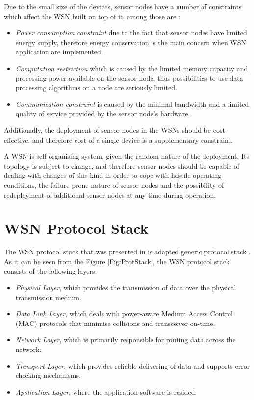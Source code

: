 Due to the small size of the devices, sensor nodes have a number of constraints
which affect the WSN built on top of it, among those are \cite{yao:qps}:
\begin{itemize}
  \item \emph{Power consumption constraint} due to the fact that sensor nodes
  have limited energy supply, therefore energy conservation is the main concern when
  WSN application are implemented.
  \item \emph{Computation restriction} which is caused by the limited memory
  capacity and processing power available on the sensor node, thus possibilities to
  use data processing algorithms on a node are seriously limited. 
  \item \emph{Communication constraint} is caused by the minimal bandwidth and a
  limited quality of service provided by the sensor node's hardware. 
\end{itemize}

Additionally, the deployment of sensor nodes in the WSNs should be
cost-effective, and therefore cost of a single device is a supplementary constraint.

A WSN is self-organising system, given the random nature of the deployment. Its
topology is subject to change, and therefore sensor nodes should be capable of
dealing with changes of this kind in order to cope with hostile operating
conditions, the failure-prone nature of sensor nodes and the possibility of
redeployment of additional sensor nodes at any time during operation.

\section{WSN Protocol Stack} \label{sec:WSNProtStack}

The WSN protocol stack that was presented in \cite{SensorSurveyAkyildiz:2002} is
adapted generic protocol stack \cite{ComputerNetworksTannenbaum:2003}. As
it can be seen from the Figure \ref{Fig:ProtStack}, the WSN protocol stack consists of the following layers:

\begin{itemize}
\item \emph{Physical Layer}, which provides the transmission of data over the physical transmission medium.
\item \emph{Data Link Layer}, which deals with power-aware Medium Access Control (MAC) protocols that minimise collisions and transceiver on-time.
\item \emph{Network Layer}, which is primarily responsible for
routing data across the network.
\item \emph{Transport Layer}, which provides reliable delivering of data and
supports error checking mechanisms.
\item \emph{Application Layer}, where the application software is resided.
\end{itemize}

